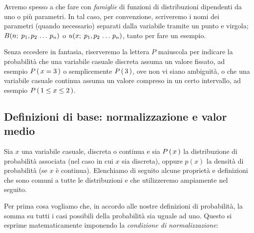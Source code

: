 Avremo spesso a che fare con \emph{famiglie} di funzioni di
distribuzioni dipendenti da uno o pi\`u parametri. In tal caso, per
convenzione, scriveremo i nomi dei parametri (quando necessario)
separati dalla variabile tramite un punto e virgola;
$B(n;\; p_1, p_2 \, \ldots \, p_n)$ o $u(x;\; p_1, p_2 \, \ldots \, p_n)$,
tanto per fare un esempio.

\begin{exemplify}


\end{exemplify}

\noindent Senza eccedere in fantasia, riserveremo la lettera $P$ maiuscola per
indicare la probabilit\`a che una variabile casuale discreta assuma un
valore fissato, ad esempio $\displaystyle P\left(\, x =3 \, \right)$ o semplicemente $\displaystyle P\left(\, 3 \, \right)$, ove non vi
siano ambiguit\`a, o che una variabile casuale continua assuma un valore
compreso in un certo intervallo, ad esempio $\displaystyle P\left(\, 1 \leq x \leq 2 \, \right)$.


\subsection{\label{subsec:NormalizzazioneMedia}Definizioni di base:
  normalizzazione e valor medio}

Sia $x$ una variabile casuale, discreta o continua e sia $\displaystyle P\left(\, x \, \right)$ la
distribuzione di probabilit\`a associata (nel caso in cui $x$ sia
discreta), oppure $p(x)$ la densit\`a di probabilit\`a (se $x$ \`e
continua).
Elenchiamo di seguito alcune propriet\`a e definizioni che sono
comuni a tutte le distribuzioni e che utilizzeremo ampiamente nel seguito.

Per prima cosa vogliamo che, in accordo alle nostre definizioni
di probabilit\`a, la somma su tutti i casi possibili della
probabilit\`a sia uguale ad uno. Questo si esprime matematicamente imponendo
la {\itshape condizione di normalizzazione}:

